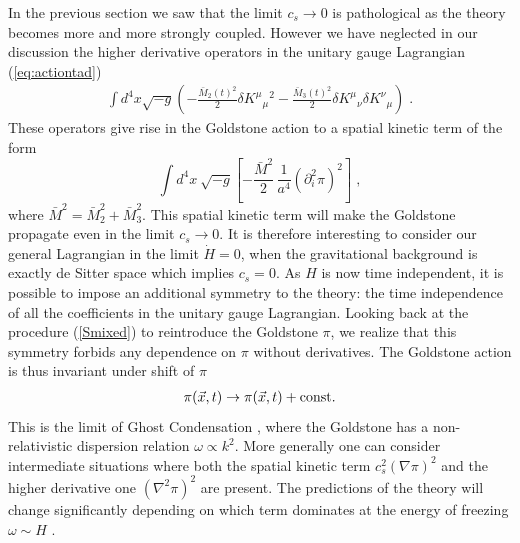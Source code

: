 \documentclass[12pt,letterpaper]{article}
\def\be{\begin{eqnarray}}
\def\ee{\end{eqnarray}}
\newcommand{\di}{\partial}
\begin{document}
{In the previous section we saw that the limit $c_s \to 0$ is
pathological as the theory becomes more and more strongly
coupled. However we have neglected in our discussion the higher derivative
operators in the unitary gauge Lagrangian (\ref{eq:actiontad})
\be
\int d^4 x \sqrt{-g} \left(-\frac{\bar M_2(t)^2}{2} \delta K^\mu {}_\mu {}^2
-\frac{\bar M_3(t)^2}{2} \delta K^\mu {}_\nu \delta K^\nu {}_\mu
\right) \;.
\ee
These operators give rise in the Goldstone action to a spatial kinetic term of the
form
\begin{equation}
\label{di_pi2}  \int  \! d^4x \: \sqrt{-g} \left[ - \frac{\bar M^2}{2} \, \frac{1}{a^4}(\di_i^2 \pi)^2
   \right] \; ,
\end{equation}
where $\bar M^2 = \bar M_2^2+  \bar M_3^2$. 
This spatial kinetic term will make the Goldstone propagate even in
the limit $c_s \to 0$. It is therefore interesting to consider our
general Lagrangian in the limit $\dot H = 0$, when the gravitational
background is exactly de Sitter space which implies $c_s=0$. As $H$ is now time independent,
it is possible to impose an additional symmetry to the theory: the
time independence of all the coefficients in the unitary gauge
Lagrangian. Looking back at the procedure (\ref{Smixed}) to reintroduce the Goldstone
$\pi$, we realize that this symmetry forbids any dependence on $\pi$
without derivatives. The Goldstone action is thus invariant under
shift of $\pi$ 
\be
\pi(\vec x,t) \to \pi(\vec x,t) + {\rm const.}
\ee
 This is the limit of
Ghost Condensation \cite{Arkani-Hamed:2003uy}, where the Goldstone has a non-relativistic
dispersion relation $\omega \propto k^2$. More generally one can
consider intermediate situations where both the spatial kinetic term $c_s^2
(\nabla\pi)^2$ and the higher derivative one $(\nabla^2\pi)^2$ are
present. The predictions of the theory will change significantly
depending on which term dominates at the energy of freezing $\omega
\sim H$ \cite{Arkani-Hamed:2003uz,Senatore:2004rj}.




}
\end{document}
